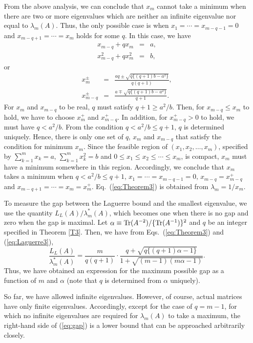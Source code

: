 \documentclass{amsart}
\begin{document}
From the above analysis, we can conclude that $x_m$ cannot take a minimum when there are two or more eigenvalues which are neither an infinite eigenvalue nor equal to $\lambda_m(A)$. Thus, the only possible case is when $x_1=\cdots=x_{m-q-1}=0$ and $x_{m-q+1}=\cdots=x_m$ holds for some $q$. In this case, we have
\begin{eqnarray}
x_{m-q}+q x_m &=& a, \\
x_{m-q}^2 + q x_m^2 &=& b,
\end{eqnarray}
or
\begin{eqnarray}
x_m^{\pm} &=& \frac{aq\pm\sqrt{q\{(q+1)b-a^2\}}}{q(q+1)}, \\
x_{m-q}^{\pm} &=& \frac{a\mp\sqrt{q\{(q+1)b-a^2\}}}{q+1}.
\end{eqnarray}
For $x_m$ and $x_{m-q}$ to be real, $q$ must satisfy $q+1\ge a^2/b$. Then, for $x_{m-q}\le x_m$ to hold, we have to choose $x_m^+$ and $x_{m-q}^+$. In addition, for $x_{m-q}^+>0$ to hold, we must have $q<a^2/b$. From the condition $q<a^2/b\le q+1$, $q$ is determined uniquely. Hence, there is only one set of $q$, $x_m$ and $x_{m-q}$ that satisfy the condition for minimum $x_m$. Since the feasible region of $(x_1, x_2, \ldots, x_m)$, specified by $\sum_{k=1}^m x_k=a$, $\sum_{k=1}^m x_k^2=b$ and $0\le x_1\le x_2\le \cdots \le x_m$, is compact, $x_m$ must have a minimum somewhere in this region. Accordingly, we conclude that $x_m$ takes a minimum when $q<a^2/b\le q+1$, $x_1=\cdots=x_{m-q-1}=0$, $x_{m-q}=x_{m-q}^+$ and $x_{m-q+1}=\cdots=x_m=x_m^+$. Eq.~(\ref {eq:Theorem3}) is obtained from $\lambda_m=1/x_m$.
\endproof

To measure the gap between the Laguerre bound and the smallest eigenvalue, we use the quantity $L_L(A)/\lambda_m^*(A)$, which becomes one when there is no gap and zero when the gap is maximal. Let $\alpha\equiv {\rm Tr}(A^{-2})/\{{\rm Tr}(A^{-1})\}^2$ and $q$ be an integer specified in Theorem \ref{T3}. Then, we have from Eqs.~(\ref{eq:Theorem3}) and (\ref{eq:Laguerre3}),
\begin{equation}
\frac{L_L(A)}{\lambda_m^*(A)} = \frac{m}{q(q+1)}\cdot\frac{q+\sqrt{q\{(q+1)\alpha-1\}}}{1+\sqrt{(m-1)(m\alpha-1)}}.
\label{eq:gap}
\end{equation}
Thus, we have obtained an expression for the maximum possible gap as a function of $m$ and $\alpha$ (note that $q$ is determined from $\alpha$ uniquely).

So far, we have allowed infinite eigenvalues. However, of course, actual matrices have only finite eigenvalues. Accordingly, except for the case of $q=m-1$, for which no infinite eigenvalues are required for $\lambda_m(A)$ to take a maximum, the right-hand side of (\ref{eq:gap}) is a lower bound that can be approached arbitrarily closely.
\end{document}
